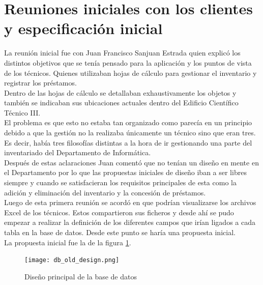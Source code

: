 \section{Reuniones iniciales con los clientes y especificación inicial}

La reunión inicial fue con Juan Francisco Sanjuan Estrada quien explicó los distintos objetivos que se tenía pensado para la aplicación y los puntos de vista de los técnicos. Quienes utilizaban hojas de cálculo para gestionar el inventario y registrar los préstamos.
\\Dentro de las hojas de cálculo se detallaban exhaustivamente los objetos y también se indicaban sus ubicaciones actuales dentro del Edificio Científico Técnico III.
\\El problema es que esto no estaba tan organizado como parecía en un principio debido a que la gestión no la realizaba únicamente un técnico sino que eran tres. Es decir, había tres filosofías distintas a la hora de ir gestionando una parte del inventariado del Departamento de Informática.
\\Después de estas aclaraciones Juan comentó que no tenían un diseño en mente en el Departamento por lo que las propuestas iniciales de diseño iban a ser libres siempre y cuando se satisfacieran los requisitos principales de esta como la adición y eliminación del inventario y la concesión de préstamos.
\vspace{\baselineskip}
\\Luego de esta primera reunión se acordó en que podrían visualizarse los archivos Excel de los técnicos. Estos compartieron sus ficheros y desde ahí se pudo empezar a realizar la definición de los diferentes campos que irían ligados a cada tabla en la base de datos. Desde este punto se haría una propuesta inicial.
\\La propuesta inicial fue la de la figura \ref{diseno_principal_base_datos}.

\begin{figure}[h]
    \texttt{[image: db\_old\_design.png]}
    \caption{Diseño principal de la base de datos}\label{diseno_principal_base_datos}
\end{figure}

